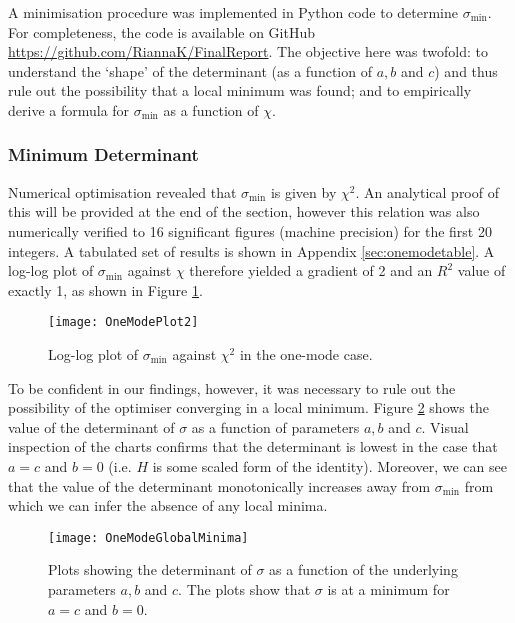 \documentclass[11pt,a4paper]{article}
\numberwithin{equation}{section}
\begin{document}
	A minimisation procedure was implemented in Python code to determine $\sigma_\text{min}$. For completeness, the code is available on GitHub \url{https://github.com/RiannaK/FinalReport}. The objective here was twofold: to understand the `shape' of the determinant (as a function of $a, b$ and $c$) and thus rule out the possibility that a local minimum was found; and to empirically derive a formula for $\sigma_\text{min}$ as a function of $\chi$.
	
	\subsubsection{Minimum Determinant}
	
	Numerical optimisation revealed that $\sigma_\text{min}$ is given by $\chi^{2}$. An analytical proof of this will be provided at the end of the section, however this relation was also numerically verified to 16 significant figures (machine precision) for the first 20 integers. A tabulated set of results is shown in Appendix \ref{sec:onemodetable}. A log-log plot of $\sigma_\text{min}$ against $\chi$ therefore yielded a gradient of 2 and an $R^2$ value of exactly 1, as shown in Figure \ref{fig:OneModePlot}.
	
	\begin{figure} [h]
		\centering
		\texttt{[image: OneModePlot2]}
		\caption[One mode case: log-log plot of $\sigma_\text{min}$ against $\chi^2$]{Log-log plot of $\sigma_\text{min}$ against $\chi^2$ in the one-mode case.}
		\label{fig:OneModePlot}
	\end{figure}
	
	To be confident in our findings, however, it was necessary to rule out the possibility of the optimiser converging in a local minimum. Figure \ref{fig:OneModeGlobalMinima} shows the value of the determinant of $\sigma$ as a function of parameters $a, b$ and $c$. Visual inspection of the charts confirms that the determinant is lowest in the case that $a=c$ and $b=0$ (i.e. $H$ is some scaled form of the identity). Moreover, we can see that the value of the determinant monotonically increases away from $\sigma_\text{min}$ from which we can infer the absence of any local minima. 
	
	\begin{figure}
		\centering
		\texttt{[image: OneModeGlobalMinima]}
		\caption[One mode case: determinant plots]{Plots showing the determinant of $\sigma$ as a function of the underlying parameters $a, b$ and $c$. The plots show that $\sigma$ is at a minimum for $a=c$ and $b=0$.}
		\label{fig:OneModeGlobalMinima}
	\end{figure}
	
\end{document}
